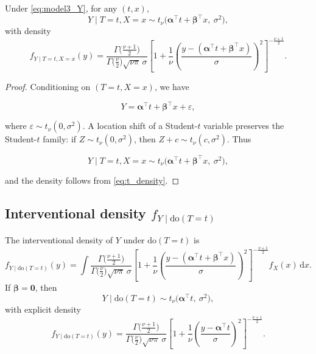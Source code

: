 \documentclass[11pt]{article}
\begin{document}
\begin{theorem}
Under \eqref{eq:model3_Y}, for any $(t,x)$,
\begin{equation}
    Y \mid T=t, X=x \sim t_\nu\big(\bm{\alpha}^\top t + \bm{\beta}^\top x,\ \sigma^2\big),
    \label{eq:model3_conditional_law}
\end{equation}
with density
\begin{equation}
    f_{Y \mid T=t, X=x}(y)
    = \frac{\Gamma\big(\frac{\nu+1}{2}\big)}{\Gamma\big(\frac{\nu}{2}\big)\sqrt{\nu\pi}\,\sigma}
      \left[1 + \frac{1}{\nu}\left(\frac{y - (\bm{\alpha}^\top t + \bm{\beta}^\top x)}{\sigma}\right)^2\right]^{-\frac{\nu+1}{2}}.
    \label{eq:model3_conditional_density}
\end{equation}
\end{theorem}

\begin{proof}
Conditioning on $(T=t,X=x)$, we have


\[
Y = \bm{\alpha}^\top t + \bm{\beta}^\top x + \varepsilon,
\]


where $\varepsilon \sim t_\nu(0,\sigma^2)$.
A location shift of a Student-$t$ variable preserves the Student-$t$ family:
if $Z \sim t_\nu(0,\sigma^2)$, then $Z + c \sim t_\nu(c,\sigma^2)$.
Thus


\[
Y \mid T=t,X=x \sim t_\nu\big(\bm{\alpha}^\top t + \bm{\beta}^\top x,\ \sigma^2\big),
\]


and the density follows from \eqref{eq:t_density}.
\end{proof}

\subsection{Interventional density $f_{Y \mid \mathrm{do}(T=t)}$}

\begin{theorem}
The interventional density of $Y$ under $\mathrm{do}(T=t)$ is
\begin{equation}
    f_{Y \mid \mathrm{do}(T=t)}(y)
    = \int \frac{\Gamma\big(\frac{\nu+1}{2}\big)}{\Gamma\big(\frac{\nu}{2}\big)\sqrt{\nu\pi}\,\sigma}
      \left[1 + \frac{1}{\nu}\left(\frac{y - (\bm{\alpha}^\top t + \bm{\beta}^\top x)}{\sigma}\right)^2\right]^{-\frac{\nu+1}{2}}
      f_X(x)\, \mathrm{d}x.
    \label{eq:model3_interventional_density_general}
\end{equation}
If $\bm{\beta} = \bm{0}$, then
\begin{equation}
    Y \mid \mathrm{do}(T=t) \sim t_\nu\big(\bm{\alpha}^\top t,\ \sigma^2\big),
    \label{eq:model3_interventional_law_simple}
\end{equation}
with explicit density
\begin{equation}
    f_{Y \mid \mathrm{do}(T=t)}(y)
    = \frac{\Gamma\big(\frac{\nu+1}{2}\big)}{\Gamma\big(\frac{\nu}{2}\big)\sqrt{\nu\pi}\,\sigma}
      \left[1 + \frac{1}{\nu}\left(\frac{y - \bm{\alpha}^\top t}{\sigma}\right)^2\right]^{-\frac{\nu+1}{2}}.
    \label{eq:model3_interventional_density_simple}
\end{equation}
\end{theorem}
\end{document}
